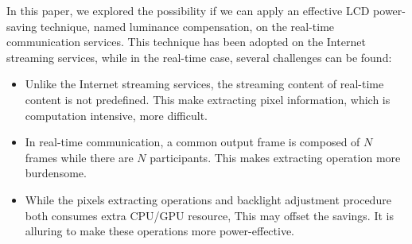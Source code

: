 In this paper, we explored the possibility if we can apply an
effective LCD power-saving technique, named luminance compensation, on
the real-time communication services. This technique has been adopted
on the Internet streaming services, while in the real-time case,
several challenges can be found:
\begin{itemize}
  \item
    {
      Unlike the Internet streaming services, the streaming content of
      real-time content is not predefined. This make extracting pixel
      information, which is computation intensive, more difficult.
    }
  \item
    {
      In real-time communication, a common output frame is composed of
      $N$ frames while there are $N$ participants. This makes
      extracting operation more burdensome.
    }
  \item
    {
      While the pixels extracting operations and backlight adjustment
      procedure both consumes extra CPU/GPU resource, This may offset
      the savings. It is alluring to make these operations more
      power-effective.
    }
\end{itemize}





